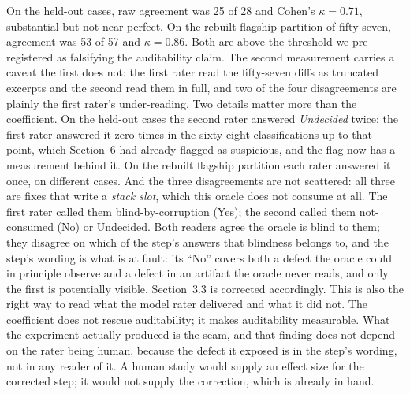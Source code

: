 On the held-out cases, raw agreement was 25 of 28 and Cohen's $\kappa = 0.71$,
substantial but not near-perfect. On the rebuilt flagship partition of fifty-seven,
agreement was 53 of 57 and $\kappa = 0.86$. Both are above the threshold we
pre-registered as falsifying the auditability claim. The second measurement carries a
caveat the first does not: the first rater read the fifty-seven diffs as truncated
excerpts and the second read them in full, and two of the four disagreements are
plainly the first rater's under-reading. Two details matter more than the coefficient. On the held-out cases the second rater
answered \emph{Undecided} twice; the first rater answered it zero times in the
sixty-eight classifications up to that point, which Section~6 had already flagged as
suspicious, and the flag now has a measurement behind it. On the rebuilt flagship
partition each rater answered it once, on different cases. And the three disagreements are not
scattered: all three are fixes that write a \emph{stack slot}, which this oracle does
not consume at all. The first rater called them blind-by-corruption (Yes); the second
called them not-consumed (No) or Undecided. Both readers agree the oracle is blind to
them; they disagree on which of the step's answers that blindness belongs to, and the
step's wording is what is at fault: its ``No'' covers both a defect the oracle could
in principle observe and a defect in an artifact the oracle never reads, and only the
first is potentially visible. Section~3.3 is corrected accordingly. This is also the
right way to read what the model rater delivered and what it did not. The coefficient
does not rescue auditability; it makes auditability measurable. What the experiment
actually produced is the seam, and that finding does not depend on the rater being
human, because the defect it exposed is in the step's wording, not in any reader of
it. A human study would supply an effect size for the corrected step; it would not
supply the correction, which is already in hand.
